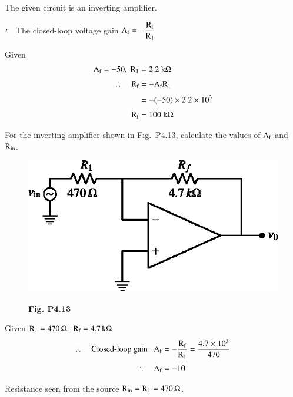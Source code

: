 \begin{solution}
The given circuit is an inverting amplifier.

$\therefore$~ The closed-loop voltage gain $\textrm{A}_{\textrm{f}}=-\dfrac{\textrm{R}_{\textrm{f}}}{\textrm{R}_{1}}$

Given
\begin{align*}
\textrm{A}_{\textrm{f}}=-50, ~ \textrm{R}_{1} &= 2.2~ \textrm{k}\Omega\\[3pt]
\therefore\quad \textrm{R}_{\textrm{f}} &= -\textrm{A}_{\textrm{f}}\textrm{R}_{1}\\[3pt]
&= -(-50)\times 2.2\times 10^{3}\\[3pt]
\textrm{R}_{\textrm{f}} &= 100~ \textrm{k} \Omega
\end{align*}
\end{solution}

\begin{problem}\label{prob4.13}
For the inverting amplifier shown in Fig.~P4.13, calculate the values of $\textrm{A}_{\textrm{f}}$ and $\textrm{R}_{\text{in}}$.
\begin{figure}[H]
\centering
\includegraphics{chap4/figP4.13.eps}

\smallskip
{\bf Fig. P4.13}
\end{figure}
\end{problem}

\begin{solution}
Given $\textrm{R}_{1}=470\,\Omega$, $\textrm{R}_{\textrm{f}}=4.7\,\textrm{k}\Omega$
\begin{align*}
\therefore\quad \text{Closed-loop gain~~ } \textrm{A}_{\text{f}} &= -\frac{\textrm{R}_{\textrm{f}}}{\textrm{R}_{1}}=\frac{4.7\times 10^{3}}{470}\\[3pt]
\therefore\quad \textrm{A}_{\textrm{f}} &= -10
\end{align*}

Resistance seen from the source $\textrm{R}_{\text{in}}=\textrm{R}_{1}=470\,\Omega$.
\end{solution}

